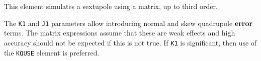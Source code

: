 This element simulates a sextupole using a matrix, up to third order.

The \verb|K1| and \verb|J1| parameters allow introducing normal and skew quadrupole {\bf error} terms.
The matrix expressions assume that
these are weak effects and high accuracy should not be expected if this is not true.
If \verb|K1| is significant, then use of the \verb|KQUSE| element is preferred.

